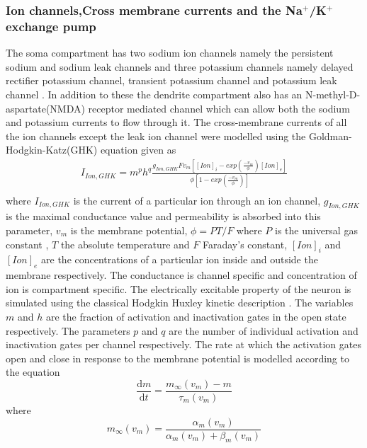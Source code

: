\documentclass[fleqn]{report}
\numberwithin{equation}{section}
\numberwithin{equation}{section}
\begin{document}
				\subsubsection{Ion channels,Cross membrane currents and the Na${^+}$/K${^+}$ exchange pump} 
				The soma compartment has two sodium ion channels namely the persistent sodium and sodium leak channels and three potassium channels namely delayed rectifier potassium channel, transient potassium channel and potassium leak channel . In addition to these the dendrite compartment also has an N-methyl-D-aspartate(NMDA) receptor mediated channel which can allow both the sodium and potassium currents to flow through it. The cross-membrane currents of all the ion channels except the leak ion channel were modelled using the Goldman-Hodgkin-Katz(GHK) equation given as
				 \begin{equation} %
				 \begin{aligned}
				I_{Ion,GHK}=m^{p}h^{q}\frac{g_{Ion,GHK}Fv_m[[Ion]_i-exp(\frac{-v_m}{\phi})[Ion]_e]}{\phi[1-exp(\frac{-v_m}{\phi})]}\\
				\end{aligned}
				\end{equation} 
				where $I_{Ion,GHK}$ is the current of a particular ion through an ion channel, $ g_{Ion,GHK} $ is the maximal conductance value and permeability is absorbed into this parameter, $v_m$ is the membrane potential, $\phi=PT/F$ where $P$ is the universal gas constant , $T$ the absolute temperature and $F$ Faraday's constant, $[Ion]_i$  and $[Ion]_e$ are the concentrations of a particular ion inside and outside the membrane respectively. The conductance is channel specific and concentration of ion is compartment specific. The electrically excitable property of the neuron is simulated using the classical Hodgkin Huxley kinetic description \citep{Hodgkin1952}. The variables $m$ and $h$ are the fraction of activation and inactivation gates in the open state respectively. The parameters $p$ and $q$ are the number of individual activation and inactivation gates per channel respectively. The rate at which the activation gates open and close in response to the membrane potential is modelled according to the equation
				\begin{equation} %
				\dfrac{\mathrm{d}m}{\mathrm{d}t}=\frac{m_{\infty}(v_m)-m}{\tau_m(v_m)}
				\end{equation}
				where 
				\begin{equation} %
				m_{\infty}(v_m)=\frac{\alpha_m(v_m)}{\alpha_m(v_m)+\beta_m(v_m)}
				\end{equation}
\end{document}
